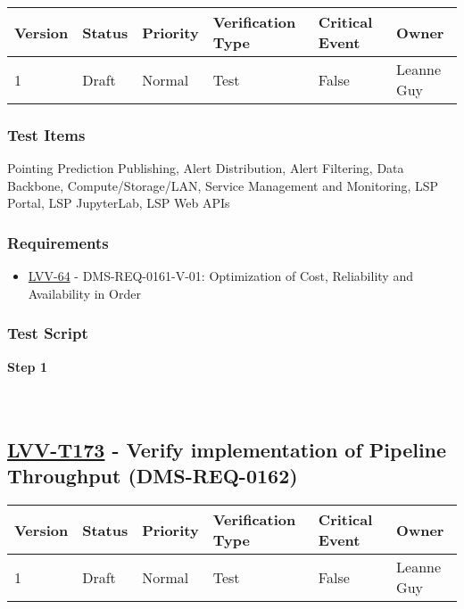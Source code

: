 \begin{longtable}[]{@{}llllll@{}}
\toprule
Version & Status & Priority & Verification Type & Critical Event &
Owner\tabularnewline
\midrule
\endhead
1 & Draft & Normal & Test & False & Leanne Guy\tabularnewline
\bottomrule
\end{longtable}

\hypertarget{test-items-148}{%
\subsubsection{Test Items}\label{test-items-148}}

Pointing Prediction Publishing, Alert Distribution, Alert Filtering,
Data Backbone, Compute/Storage/LAN, Service Management and Monitoring,
LSP Portal, LSP JupyterLab, LSP Web APIs

\hypertarget{requirements-149}{%
\subsubsection{Requirements}\label{requirements-149}}

\begin{itemize}
\tightlist
\item
  \href{https://jira.lsstcorp.org/browse/LVV-64}{LVV-64} -
  DMS-REQ-0161-V-01: Optimization of Cost, Reliability and Availability
  in Order
\end{itemize}

\hypertarget{test-script-149}{%
\subsubsection{Test Script}\label{test-script-149}}

\textbf{Step 1}\\
~\\
~\\

\hypertarget{lvv-t173---verify-implementation-of-pipeline-throughput-dms-req-0162}{%
\subsection{\texorpdfstring{\href{https://jira.lsstcorp.org/secure/Tests.jspa\#/testCase/LVV-T173}{LVV-T173}
- Verify implementation of Pipeline Throughput
(DMS-REQ-0162)}{LVV-T173 - Verify implementation of Pipeline Throughput (DMS-REQ-0162)}}\label{lvv-t173---verify-implementation-of-pipeline-throughput-dms-req-0162}}

\begin{longtable}[]{@{}llllll@{}}
\toprule
Version & Status & Priority & Verification Type & Critical Event &
Owner\tabularnewline
\midrule
\endhead
1 & Draft & Normal & Test & False & Leanne Guy\tabularnewline
\bottomrule
\end{longtable}

